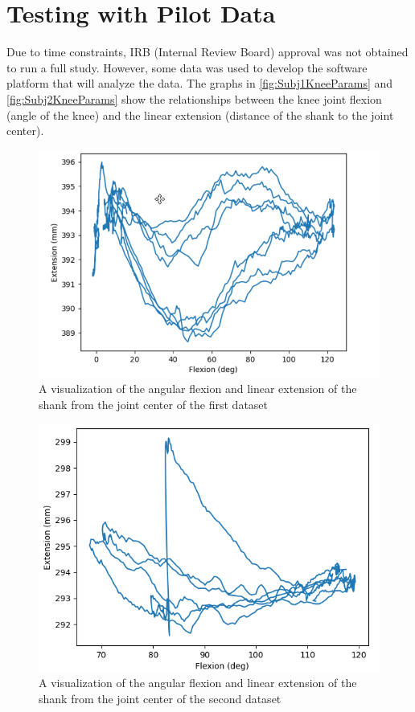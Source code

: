 \section{Testing with Pilot Data}
Due to time constraints, IRB (Internal Review Board) approval was not obtained to run a full study. However, some data was used to develop the software platform that will analyze the data. The graphs in \autoref{fig:Subj1KneeParams} and \autoref{fig:Subj2KneeParams} show the relationships between the knee joint flexion (angle of the knee) and the linear extension (distance of the shank to the joint center).

\begin{figure}[ht!]
    \centering
    \includegraphics[width=\textwidth]{Figures/Param/Subj1_KneeProfile.png}
    \caption{A visualization of the angular flexion and linear extension of the shank from the joint center of the first dataset}
    \label{fig:Subj1KneeParams}
\end{figure}

\begin{figure}[ht!]
    \centering
    \includegraphics[width=\textwidth]{Figures/Param/Subj2_KneeProfile.png}
    \caption{A visualization of the angular flexion and linear extension of the shank from the joint center of the second dataset}
    \label{fig:Subj2KneeParams}
\end{figure}

